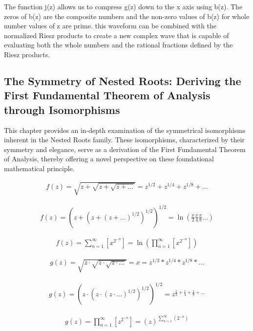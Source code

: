 \documentclass{article}
\newcommand{\sidesum}[2]{\displaystyle\sum\nolimits_{\scriptstyle #1}^{\scriptstyle #2}}
\begin{document}
The function j(z) allows us to compress g(z) down to the x axis using b(z). The zeros of b(z) are the composite numbers and the non-zero values of b(z) for whole number values of z are prime. this waveform can be combined with the normalized Riesz products to create a new complex wave that is capable of evaluating both the whole numbers and the rational fractions defined by the Riesz products.

\newpage
\subsection*{The Symmetry of Nested Roots: Deriving the First Fundamental Theorem of Analysis through Isomorphisms}

This chapter provides an in-depth examination of the symmetrical isomorphisms inherent in the Nested Roots family. These isomorphisms, characterized by their symmetry and elegance, serve as a derivation of the First Fundamental Theorem of Analysis, thereby offering a novel perspective on these foundational mathematical principle.

\begin{align*}
f(z) = \sqrt{z + \sqrt{z + \sqrt{z + \ldots}}} = z^{1/2} + z^{1/4} + z^{1/8} + \ldots
\end{align*}

\begin{align*}
f(z) = \left(z + \left(z + \left(z + \ldots\right)^{1/2}\right)^{1/2}\right)^{1/2} = \ln(\frac{x}{2}\frac{x}{4}\frac{x}{8}\ldots)
\end{align*}

\begin{align*}
f(z) = \sum_{n=1}^{\infty} \left[x^{2^{-n}}\right] = \ln\left(\prod_{n=1}^{\infty} \left[x^{2^{-n}}\right]\right)
\end{align*}

\begin{align*}
g(z) = \sqrt{z \cdot \sqrt{z \cdot \sqrt{z \cdot \ldots}}} = x = z^{1/2} * z^{1/4} * z^{1/8} * \ldots
\end{align*}

\begin{align*}
g(z) = \left(z \cdot \left(z \cdot \left(z \cdot \ldots\right)^{1/2}\right)^{1/2}\right)^{1/2} = z^{\frac{1}{2} + \frac{1}{4} + \frac{1}{8} + \ldots}
\end{align*}

\begin{align*}
g(z) = \prod_{n=1}^{\infty} \left[z^{2^{-n}}\right] = (z)^{\sidesum{n=1}{\infty}(2^{-n})}
\end{align*}
\end{document}
